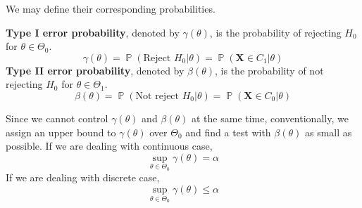 \documentclass{huhtakm-template-book-v2}
\DeclareMathOperator{\prob}{\mathbb{P}}
\begin{document}
\newpage
We may define their corresponding probabilities.
\begin{defn}
	\textbf{Type I error probability}, denoted by $\gamma(\theta)$, is the probability of rejecting $H_{0}$ for $\theta\in\Theta_{0}$.
	\begin{equation*}
		\gamma(\theta)=\prob(\text{Reject }H_{0}|\theta)=\prob(\mathbf{X}\in C_{1}|\theta)
	\end{equation*}
	\textbf{Type II error probability}, denoted by $\beta(\theta)$, is the probability of not rejecting $H_{0}$ for $\theta\in\Theta_{1}$.
	\begin{equation*}
		\beta(\theta)=\prob(\text{Not reject }H_{0}|\theta)=\prob(\mathbf{X}\in C_{0}|\theta)
	\end{equation*}
\end{defn}
\begin{rem}
	Since we cannot control $\gamma(\theta)$ and $\beta(\theta)$ at the same time, conventionally, we assign an upper bound to $\gamma(\theta)$ over $\Theta_{0}$ and find a test with $\beta(\theta)$ as small as possible. If we are dealing with continuous case,
	\begin{equation*}
		\sup_{\theta\in\Theta_{0}}\gamma(\theta)=\alpha
	\end{equation*}
	If we are dealing with discrete case,
	\begin{equation*}
		\sup_{\theta\in\Theta_{0}}\gamma(\theta)\leq\alpha
	\end{equation*}
\end{rem}
\end{document}
